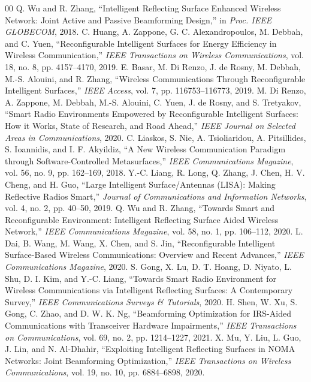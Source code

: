 \documentclass[journal]{IEEEtran}
\begin{document}
\FloatBarrier
\begin{thebibliography}{00}
 Q. Wu and R. Zhang, ``Intelligent Reflecting Surface Enhanced Wireless Network: Joint Active and Passive Beamforming Design,'' in \emph{Proc. IEEE GLOBECOM}, 2018.
 C. Huang, A. Zappone, G. C. Alexandropoulos, M. Debbah, and C. Yuen, ``Reconfigurable Intelligent Surfaces for Energy Efficiency in Wireless Communication,'' \emph{IEEE Transactions on Wireless Communications}, vol. 18, no. 8, pp. 4157--4170, 2019.
 E. Basar, M. Di Renzo, J. de Rosny, M. Debbah, M.-S. Alouini, and R. Zhang, ``Wireless Communications Through Reconfigurable Intelligent Surfaces,'' \emph{IEEE Access}, vol. 7, pp. 116753--116773, 2019.
 M. Di Renzo, A. Zappone, M. Debbah, M.-S. Alouini, C. Yuen, J. de Rosny, and S. Tretyakov, ``Smart Radio Environments Empowered by Reconfigurable Intelligent Surfaces: How it Works, State of Research, and Road Ahead,'' \emph{IEEE Journal on Selected Areas in Communications}, 2020.
 C. Liaskos, S. Nie, A. Tsioliaridou, A. Pitsillides, S. Ioannidis, and I. F. Akyildiz, ``A New Wireless Communication Paradigm through Software-Controlled Metasurfaces,'' \emph{IEEE Communications Magazine}, vol. 56, no. 9, pp. 162--169, 2018.
 Y.-C. Liang, R. Long, Q. Zhang, J. Chen, H. V. Cheng, and H. Guo, ``Large Intelligent Surface/Antennas (LISA): Making Reflective Radios Smart,'' \emph{Journal of Communications and Information Networks}, vol. 4, no. 2, pp. 40--50, 2019.
 Q. Wu and R. Zhang, ``Towards Smart and Reconfigurable Environment: Intelligent Reflecting Surface Aided Wireless Network,'' \emph{IEEE Communications Magazine}, vol. 58, no. 1, pp. 106--112, 2020.
 L. Dai, B. Wang, M. Wang, X. Chen, and S. Jin, ``Reconfigurable Intelligent Surface-Based Wireless Communications: Overview and Recent Advances,'' \emph{IEEE Communications Magazine}, 2020.
 S. Gong, X. Lu, D. T. Hoang, D. Niyato, L. Shu, D. I. Kim, and Y.-C. Liang, ``Towards Smart Radio Environment for Wireless Communications via Intelligent Reflecting Surfaces: A Contemporary Survey,'' \emph{IEEE Communications Surveys \& Tutorials}, 2020.
 H. Shen, W. Xu, S. Gong, C. Zhao, and D. W. K. Ng, ``Beamforming Optimization for IRS-Aided Communications with Transceiver Hardware Impairments,'' \emph{IEEE Transactions on Communications}, vol. 69, no. 2, pp. 1214--1227, 2021.
 X. Mu, Y. Liu, L. Guo, J. Lin, and N. Al-Dhahir, ``Exploiting Intelligent Reflecting Surfaces in NOMA Networks: Joint Beamforming Optimization,'' \emph{IEEE Transactions on Wireless Communications}, vol. 19, no. 10, pp. 6884--6898, 2020.

\end{thebibliography}
\end{document}
